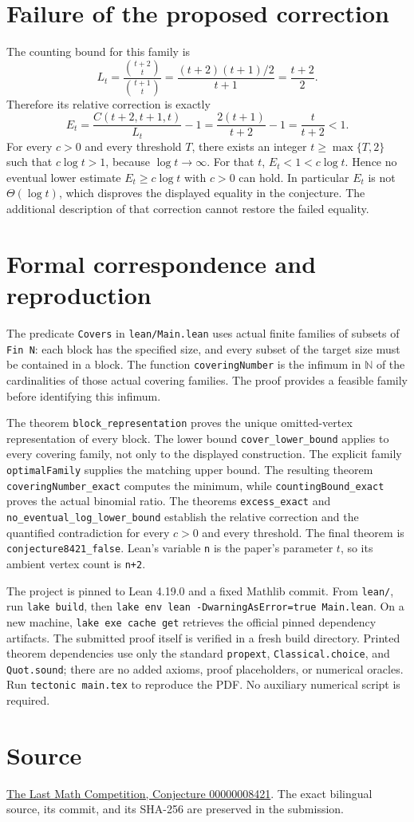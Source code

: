 \documentclass[11pt]{article}
\begin{document}
\section*{Failure of the proposed correction}
The counting bound for this family is
\[
 L_t=\frac{\binom{t+2}{t}}{\binom{t+1}{t}}
     =\frac{(t+2)(t+1)/2}{t+1}=\frac{t+2}{2}.
\]
Therefore its relative correction is exactly
\[
 E_t=\frac{C(t+2,t+1,t)}{L_t}-1
     =\frac{2(t+1)}{t+2}-1
     =\frac{t}{t+2}<1.
\]
For every $c>0$ and every threshold $T$, there exists an integer
$t\geq\max\{T,2\}$ such that $c\log t>1$, because $\log t\to\infty$.
For that $t$, $E_t<1<c\log t$. Hence no eventual lower estimate
$E_t\geq c\log t$ with $c>0$ can hold. In particular $E_t$ is not
$\Theta(\log t)$, which disproves the displayed equality in the
conjecture. The additional description of that correction cannot
restore the failed equality.

\section*{Formal correspondence and reproduction}
The predicate \texttt{Covers} in \texttt{lean/Main.lean} uses actual
finite families of subsets of \texttt{Fin N}: each block has the
specified size, and every subset of the target size must be contained
in a block. The function \texttt{coveringNumber} is the infimum in
$\mathbb N$ of the cardinalities of those actual covering families.
The proof provides a feasible family before identifying this infimum.

The theorem \texttt{block\_representation} proves the unique
omitted-vertex representation of every block. The lower bound
\texttt{cover\_lower\_bound} applies to every covering family, not
only to the displayed construction. The explicit family
\texttt{optimalFamily} supplies the matching upper bound.
The resulting theorem \texttt{coveringNumber\_exact} computes the
minimum, while \texttt{countingBound\_exact} proves the actual
binomial ratio. The theorems \texttt{excess\_exact} and
\texttt{no\_eventual\_log\_lower\_bound} establish the relative
correction and the quantified contradiction for every $c>0$ and
every threshold. The final theorem is
\texttt{conjecture8421\_false}. Lean's variable \texttt{n} is the
paper's parameter $t$, so its ambient vertex count is \texttt{n+2}.

The project is pinned to Lean 4.19.0 and a fixed Mathlib commit.
From \texttt{lean/}, run \texttt{lake build}, then
\texttt{lake env lean -DwarningAsError=true Main.lean}.
On a new machine, \texttt{lake exe cache get} retrieves the official
pinned dependency artifacts. The submitted proof itself is verified
in a fresh build directory. Printed theorem dependencies use only
the standard \texttt{propext}, \texttt{Classical.choice}, and
\texttt{Quot.sound}; there are no added axioms, proof placeholders,
or numerical oracles. Run \texttt{tectonic main.tex} to reproduce
the PDF. No auxiliary numerical script is required.

\section*{Source}
\href{https://github.com/The-Last-Math-Competition/The-Last-Math-Competition/blob/main/conjectures/00000008421.md}{The Last Math Competition, Conjecture 00000008421}.
The exact bilingual source, its commit, and its SHA-256 are preserved
in the submission.
\end{document}
